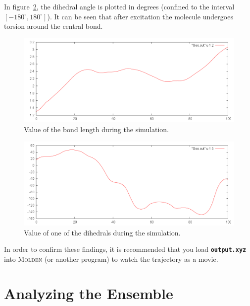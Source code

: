 \documentclass[a4paper,11pt,DIV=15,openany]{scrbook}
\newcommand{\ttt}[1]{\textbf{\texttt{#1}}}
\begin{document}
In figure~\ref{fig:dih}, the dihedral angle  is plotted in degrees (confined to the interval $[-180^\circ,180^\circ]$). 
It can be seen that after excitation the molecule undergoes torsion around the central bond.

\begin{figure}[htb]
  \centering
  \includegraphics[width=\textwidth]{figures/CC.png}
  \caption{Value of the  bond length during the simulation.}
  \label{fig:cc}
\end{figure}
\begin{figure}[htb]
  \centering
  \includegraphics[width=\textwidth]{figures/dih.png}
  \caption{Value of one of the  dihedrals during the simulation.}
  \label{fig:dih}
\end{figure}

In order to confirm these findings, it is recommended that you load \ttt{output.xyz} into \textsc{Molden} (or another program) to watch the trajectory as a movie.








\clearpage
\section{Analyzing the Ensemble}\label{sec:analyze_ensemble}
\end{document}
